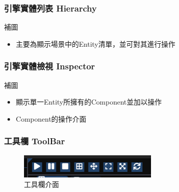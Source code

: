 \subsubsection{引擎實體列表 Hierarchy}

補圖

\begin{itemize}
\item{主要為顯示場景中的Entity清單，並可對其進行操作}
\end{itemize}

\subsubsection{引擎實體檢視 Inspector}

補圖

\begin{itemize}
\item{顯示單一Entity所擁有的Component並加以操作}
\item{Component的操作介面}

\end{itemize}


\subsubsection{工具欄 ToolBar}

\begin{figure}[h]
    \begin{center}
    \includegraphics[width=0.6\textwidth]{./resources/editor/toolbar.png}
    \end{center}
\caption{工具欄介面}
\label{fig:editor_all}
\end{figure}

